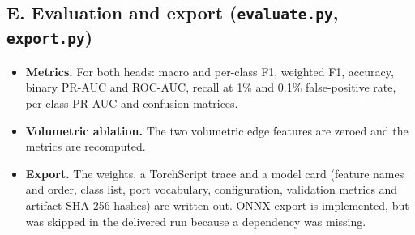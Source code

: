 \documentclass[12pt,a4paper]{report}
\begin{document}
\subsection*{E. Evaluation and export (\texttt{evaluate.py}, \texttt{export.py})}
\begin{itemize}
    \item \textbf{Metrics.} For both heads: macro and per-class F1, weighted F1, accuracy, binary PR-AUC and ROC-AUC, recall at 1\% and 0.1\% false-positive rate, per-class PR-AUC and confusion matrices.
    \item \textbf{Volumetric ablation.} The two volumetric edge features are zeroed and the metrics are recomputed.
    \item \textbf{Export.} The weights, a TorchScript trace and a model card (feature names and order, class list, port vocabulary, configuration, validation metrics and artifact SHA-256 hashes) are written out. ONNX export is implemented, but was skipped in the delivered run because a dependency was missing.
\end{itemize}
\end{document}
